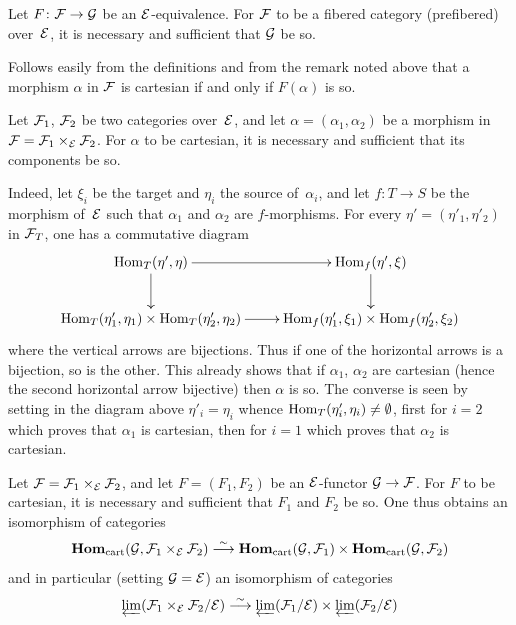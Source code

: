 \begin{proposition}
\label{VI.6.2}
Let $F \colon \cal{F} \to \cal{G}$ be an
$\cal{E}$-equivalence. For $\cal{F}$ to be a
fibered category (\resp prefibered) over~$\cal{E}$, it is necessary and
sufficient that $\cal{G}$ be so.
\end{proposition}

Follows easily from the definitions and from the remark
noted above that a morphism
$\alpha$
in $\cal{F}$ is cartesian if and only if $F(\alpha)$ is so.

\begin{proposition}
\label{VI.6.3}
Let $\cal{F}_1$, $\cal{F}_2$ be two categories over~$\cal{E}$, and
let $\alpha = (\alpha_1,\alpha_2)$ be a morphism in
$\cal{F}=\cal{F}_1 \times_{\cal{E}} \cal{F}_2$. For $\alpha$ to be
cartesian, it is necessary and sufficient that its components be so.
\end{proposition}

Indeed, let $\xi_i$ be the target and $\eta_i$ the source of~$\alpha_i$, and
let $f\colon T\to S$ be the morphism of~$\cal{E}$ such that $\alpha_1$ and
$\alpha_2$ are $f$-morphisms. For every
$\eta'=(\eta'_1,\eta'_2)$ in $\cal{F}_T$, one has a commutative
diagram
$$
\xymatrix{ \Hom_T(\eta',\eta) \ar[r] \ar[d] & \Hom_f(\eta',\xi) \ar[d]
\\ \Hom_T(\eta'_1,\eta_1)\times\Hom_T(\eta'_2,\eta_2) \ar[r] &
\Hom_f(\eta'_1,\xi_1)\times \Hom_f(\eta'_2,\xi_2) }
$$
where the vertical arrows are bijections. Thus if one
of the horizontal arrows is a bijection, so is
the other. This already shows that if $\alpha_1$, $\alpha_2$
are cartesian (hence the second horizontal arrow
bijective) then $\alpha$ is so. The converse is seen by setting
in the diagram above $\eta'_i=\eta_i$ whence
$\Hom_T(\eta'_i,\eta_i) \neq \emptyset$, first for $i=2$ which
proves that $\alpha_1$ is cartesian, then for $i=1$ which proves
that $\alpha_2$ is cartesian.

\begin{corollary}
\label{VI.6.4}
Let
$\cal{F} = \cal{F}_1\times_{\cal{E}}\cal{F}_2$, and let
$F=(F_1,F_2)$ be an $\cal{E}$-functor $\cal{G}\to\cal{F}$. For
$F$
to be cartesian, it is necessary and sufficient that $F_1$ and $F_2$
be so. One thus obtains an isomorphism of categories
$$
\SheafHom_\cart(\cal{G}, \cal{F}_1 \times_{\cal{E}} \cal{F}_2) \isomto
\SheafHom_\cart(\cal{G},\cal{F}_1)
\times\SheafHom_\cart(\cal{G},\cal{F}_2)
$$
and in particular (setting $\cal{G}=\cal{E}$) an isomorphism of
categories
$$
\varprojLim(\cal{F}_1 \times_{\cal{E}}
\cal{F}_2/\cal{E}) \isomto
\varprojLim(\cal{F}_1/\cal{E}) \times
\varprojLim(\cal{F}_2/\cal{E})
$$
\end{corollary}

